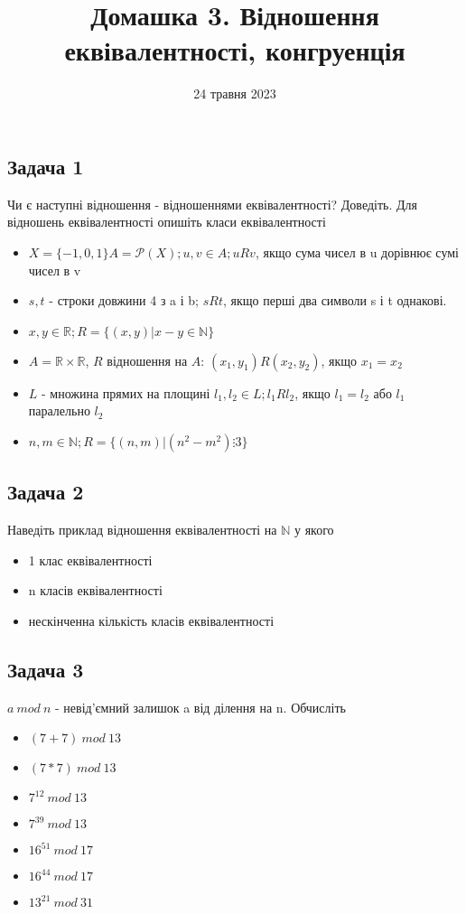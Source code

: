 \documentclass{article}
\begin{document}
\title{Домашка 3. Відношення еквівалентності, конгруенція}
\date{24 травня 2023}

\maketitle

\subsection*{Задача 1}
Чи є наступні відношення - відношеннями еквівалентності? Доведіть. Для відношень еквівалентності опишіть класи еквівалентності
\begin{itemize}
    \item $X=\{-1,0,1\} A=\mathcal{P}(X); u,v \in A; uRv$, якщо сума чисел в u дорівнює сумі чисел в v
    \item $s,t$ - строки довжини 4 з a і b; $sRt$, якщо перші два символи s і t однакові.
    \item $x,y \in \mathbb{R}; R = \{(x,y)|x-y \in \mathbb{N} \}$
    \item $A = \mathbb{R} \times \mathbb{R}$, $R$ відношення на $A$: $(x_1,y_1)R(x_2,y_2)$, якщо $x_1 = x_2$
    \item $L$ - множина прямих на площині $l_1,l_2 \in L; l_1 R l_2$, якщо $l_1=l_2$ або $l_1$ паралельно $l_2$
    \item  $n,m \in \mathbb{N}; R = \{(n,m)|(n^2-m^2) \vdots 3\}$
\end{itemize}

\subsection*{Задача 2}
Наведіть приклад відношення еквівалентності на $\mathbb{N}$ у якого
\begin{itemize}
    \item 1 клас еквівалентності
    \item n класів еквівалентності
    \item нескінченна кількість класів еквівалентності
\end{itemize}

\subsection*{Задача 3}
$a\ mod\ n$ - невід'ємний залишок a від ділення на n. Обчисліть
\begin{itemize}
    \item $(7+7)\ mod\ 13$
    \item $(7*7)\ mod\ 13$
    \item $7^{12}\ mod\ 13$
    \item $7^{39}\ mod\ 13$
    \item $16^{51}\ mod\ 17$
    \item $16^{44}\ mod\ 17$
    \item $13^{21}\ mod\ 31$
\end{itemize}
\end{document}

